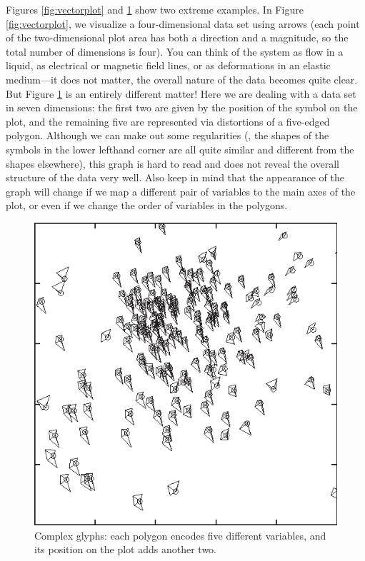 Figures \ref{fig:vectorplot} and \ref{fig:glyphplot} show two extreme
examples. In Figure \ref{fig:vectorplot}, we visualize a
four-dimensional data set using arrows (each point of the
two-dimensional plot area has both a direction and a magnitude, so the
total number of dimensions is four). You can think of the system as
flow in a liquid, as electrical or magnetic field lines, or as
deformations in an elastic medium---it does not matter, the overall
nature of the data becomes quite clear. But Figure \ref{fig:glyphplot}
is an entirely different matter! Here we are dealing with a data set
in seven dimensions: the first two are given by the position of the
symbol on the plot, and the remaining five are represented via
distortions of a five-edged polygon.  Although we can make out some
regularities (\eg, the shapes of the symbols in the lower lefthand
corner are all quite similar and different from the shapes elsewhere),
this graph is hard to read and does not reveal the overall
structure of the data very well. Also keep in mind that the
appearance of the graph will change if we map a different pair of
variables to the main axes of the plot, or even if we change the order
of variables in the polygons.

\begin{figure}
   \centerline{\includegraphics{img/glyphplot}}
  \caption{Complex glyphs: each polygon encodes five different
    variables, and its position on the plot adds another two.}
  \label{fig:glyphplot}
\end{figure}

